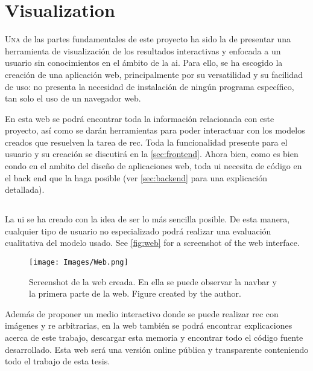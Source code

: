 

\chapter{Visualization}\label{cha:web}



\lettrine{U}{na} de las partes fundamentales de este proyecto ha sido la de
presentar una herramienta de visualización de los resultados interactivas y
enfocada a un usuario sin conocimientos en el ámbito de la \gls{ai}. Para ello,
se ha escogido la creación de una aplicación web, principalmente por su
versatilidad y su facilidad de uso: no presenta la necesidad de instalación de
ningún programa específico, tan solo el uso de un navegador web.

En esta web se podrá encontrar toda la información relacionada con este
proyecto, así como se darán herramientas para poder interactuar con los modelos
creados que resuelven la tarea de \gls{rec}. Toda la funcionalidad presente
para el usuario y su creación se discutirá en la \vref{sec:frontend}. Ahora
bien, como es bien condo en el ambito del diseño de aplicaciones web, toda
\gls{ui} necesita de código en el back end que la haga posible (ver
\vref{sec:backend} para una explicación detallada).


\section{}%
\label{sec:frontend}

La \gls{ui} se ha creado con la idea de ser lo más sencilla posible. De esta
manera, cualquier tipo de usuario no especializado podrá realizar una
evaluación cualitativa del modelo usado. See \vref{fig:web} for a screenshot of
the web interface.

\begin{figure}[ht]
  \centering
  \texttt{[image: Images/Web.png]}
  \caption[Screenshot de la web creada]{Screenshot de la web creada. En ella se
    puede observar la navbar y la primera parte de la web. Figure created by
    the author.}\label{fig:web}
\end{figure}

Además de proponer un medio interactivo donde se puede realizar \gls{rec} con
imágenes y \gls{re} arbitrarias, en la web también se podrá encontrar
explicaciones acerca de este trabajo, descargar esta memoria y encontrar todo
el código fuente desarrollado. Esta web será una versión online pública y
transparente conteniendo todo el trabajo de esta tesis.

